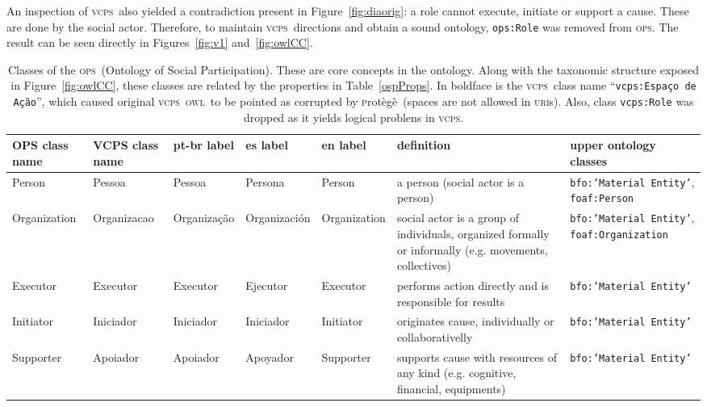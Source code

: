 \documentclass[10pt,letterpaper]{article}
\newcommand{\ops}{\textsc{ops}}
\newcommand{\vcps}{\textsc{vcps}}
\newcommand{\owl}{\textsc{owl}}
\newcommand{\uri}{\textsc{uri}}
\newcommand{\protege}{\textsc{p}rot\`eg\`e}
\begin{document}
An inspection of \vcps\ also yielded a contradiction present in Figure~\ref{fig:diaorig}:
a role cannot execute, initiate or support a cause.
These are done by the social actor.
Therefore, to maintain \vcps\ directions and obtain a sound ontology,
{\tt ops:Role} was removed from \ops.
The result can be seen directly in Figures~\ref{fig:v1} and~\ref{fig:owlCC}.

\begin{table}[!h]
\begin{adjustwidth}{-2.25in}{0in} %
    \footnotesize
  \centering
  \caption{Classes of the \ops\ (Ontology of Social Participation).
  These are core concepts in the ontology.
  Along with the taxonomic structure exposed in Figure~\ref{fig:owlCC},
  these classes are related by the properties in Table~\ref{ospProps}.
  In boldface is the \vcps\ class name ``{\tt vcps:Espa\c{c}o de A\c{c}\~ao}'',
  which caused original \vcps\ \owl\ to be pointed as corrupted by \protege\ (spaces are not allowed in \uri s).
  Also, class {\tt vcps:Role} was dropped as it yields logical problens in \vcps.}
  \begin{tabular}{|p{1.8cm}|p{1.6cm}||p{2.2cm}|p{2.2cm}|p{1.8cm}||p{4cm}||p{3cm}|}\hline
      {\bf OPS class name} & {\bf VCPS class name} & {\bf pt-br label} & {\bf es label} & {\bf en label} & {\bf definition} & {\bf upper ontology classes} \\\hline\hline
      Person & Pessoa & Pessoa & Persona & Person & a person (social actor is a person) & {\tt bfo:'Material Entity'}, {\tt foaf:Person} \\ \hline
      Organization & Organizacao & Organiza\c{c}\~ao & Organizaci\'on & Organization & social actor is a group of individuals, organized formally or informally (e.g. movements, collectives) & {\tt bfo:'Material Entity'}, {\tt foaf:Organization} \\ \hline \hline
Executor & Executor & Executor & Ejecutor & Executor & performs action directly and is responsible for results & {\tt bfo:'Material Entity'} \\ \hline
Initiator & Iniciador & Iniciador & Iniciador & Initiator & originates cause, individually or collaborativelly & {\tt bfo:'Material Entity'} \\ \hline
      Supporter & Apoiador & Apoiador & Apoyador & Supporter & supports cause with resources of any kind (e.g. cognitive, financial, equipments) & {\tt bfo:'Material Entity'} \\ \hline

\end{tabular}
\end{adjustwidth}
\end{table}
\end{document}
